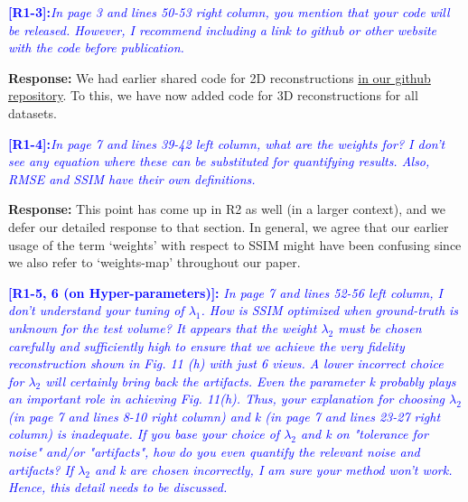 \documentclass[11pt]{article}
\begin{document}
  \vspace{0.5cm}\textcolor{blue}{\textbf{[R1-3]:}\textit{In page 3 and lines 50-53
      right column, you mention that your code will be
      released. However, I recommend including a link to github or
      other website with the code before publication.}} 

  \textbf{Response:} We had earlier shared code for 2D reconstructions
  \href{https://github.com/preetigopal/Weighted-Prior-Tomographic-Reconstruction}{in
    our github repository}. To this, we have now added code for 3D
  reconstructions for all datasets.

  \vspace{0.5cm}\textcolor{blue}{\textbf{[R1-4]:}\textit{In page 7 and lines 39-42
      left column, what are the weights for? I don't see any equation
      where these can be substituted for quantifying results. Also,
      RMSE and SSIM have their own definitions.}}

  \textbf{Response:} This point has come up in R2 as well (in a larger
  context), and we defer our detailed response to that section. In
  general, we agree that our earlier usage of the term `weights' with
  respect to SSIM might have been confusing since we also refer to
  `weights-map' throughout our paper.
  

  \vspace{0.5cm}\textcolor{blue}{\textbf{[R1-5, 6 (on Hyper-parameters)]:} \textit{In
      page 7 and lines 52-56 left column, I don't understand your
      tuning of $\lambda_1$. How is SSIM optimized when ground-truth
      is unknown for the test volume?  It appears that the weight
      $\lambda_2$ must be chosen carefully and sufficiently high to
      ensure that we achieve the very fidelity reconstruction shown in
      Fig. 11 (h) with just 6 views. A lower incorrect choice for
      $\lambda_2$ will certainly bring back the artifacts. Even the
      parameter k probably plays an important role in achieving
      Fig. 11(h). Thus, your explanation for choosing $\lambda_2$ (in
      page 7 and lines 8-10 right column) and k (in page 7 and lines
      23-27 right column) is inadequate. If you base your choice of
      $\lambda_2$ and k on "tolerance for noise" and/or "artifacts",
      how do you even quantify the relevant noise and artifacts? If
      $\lambda_2$ and k are chosen incorrectly, I am sure your method
      won't work. Hence, this detail needs to be discussed.}}
\end{document}

